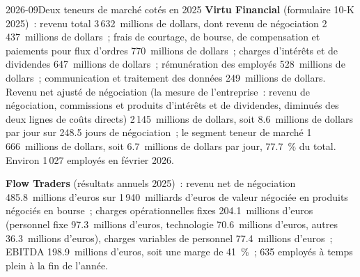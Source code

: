 \begin{omfigure}

\label{fig:hf:the-business-of-market-making:waterfall}
\end{omfigure}

\begin{dated}{2026-09}{Deux teneurs de marché cotés en 2025}\label{dat:hf:the-business-of-market-making:public}
\textbf{Virtu Financial} (formulaire 10-K 2025)~: revenu total 3\,632~millions de dollars, dont revenu de négociation 2\,437~millions de dollars~; frais de courtage, de bourse,
de compensation et paiements pour flux d'ordres 770~millions de dollars~; charges d'intérêts et de dividendes 647~millions de dollars~; rémunération des employés 528~millions de dollars~;
communication et traitement des données 249~millions de dollars. Revenu net ajusté de négociation (la mesure de l'entreprise~: revenu de négociation, commissions et produits d'intérêts et de
dividendes, diminués des deux lignes de coûts directs) 2\,145~millions de dollars, soit 8.6~millions de dollars par jour sur 248.5 jours de négociation~; le segment teneur de marché
1\,666~millions de dollars, soit 6.7~millions de dollars par jour, 77.7~\% du total. Environ 1\,027 employés en février 2026.

\textbf{Flow Traders} (résultats annuels 2025)~: revenu net de négociation 485.8~millions d'euros sur 1\,940~milliards d'euros de valeur négociée en produits négociés en bourse~;
charges opérationnelles fixes 204.1~millions d'euros (personnel fixe 97.3~millions d'euros, technologie 70.6~millions d'euros, autres 36.3~millions d'euros), charges variables
de personnel 77.4~millions d'euros~; EBITDA 198.9~millions d'euros, soit une marge de 41~\%~; 635 employés à temps plein à la fin de l'année.
\end{dated}


